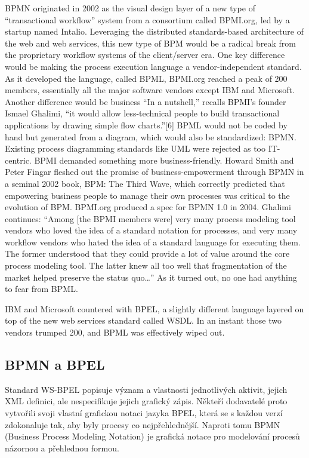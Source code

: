 \documentclass[]{article}
\begin{document}
BPMN originated in 2002 as the visual design layer of a new type of “transactional workflow” system from a consortium called BPMI.org, led by a startup named Intalio. Leveraging the distributed standards-based architecture of the web and web services, this new type of BPM would be a radical break from the proprietary workflow systems of the client/server era. One key difference would be making the process execution language a vendor-independent standard. As it developed the language, called BPML, BPMI.org reached a peak of 200 members, essentially all the major software vendors except IBM and Microsoft. Another difference would be business “In a nutshell,” recalls BPMI’s founder Ismael Ghalimi, “it would allow less-technical people to build transactional applications by drawing simple flow charts.”[6] BPML would not be coded by hand but generated from a diagram, which would also be standardized: BPMN. Existing process diagramming standards like UML were rejected as too IT-centric. BPMI demanded something more business-friendly. Howard Smith and Peter Fingar fleshed out the promise of business-empowerment through BPMN in a seminal 2002 book, BPM: The Third Wave, which correctly predicted that empowering business people to manage their own processes was critical to the evolution of BPM. BPMI.org produced a spec for BPMN 1.0 in 2004. Ghalimi continues: “Among [the BPMI members were] very many process modeling tool vendors who loved the idea of a standard notation for processes, and very many workflow vendors who hated the idea of a standard language for executing them. The former understood that they could provide a lot of value around the core process modeling tool. The latter knew all too well that fragmentation of the market helped preserve the status quo…” As it turned out, no one had anything to fear from BPML.

IBM and Microsoft countered with BPEL, a slightly different language layered on top of the new web services standard called WSDL. In an instant those two vendors trumped 200, and BPML was effectively wiped out.

\subsection{BPMN a BPEL}
Standard WS-BPEL popisuje význam a vlastnosti jednotlivých aktivit, jejich XML definici, ale nespecifikuje jejich grafický zápis.
Někteří dodavatelé proto vytvořili svoji vlastní grafickou notaci jazyka BPEL, která se s každou verzí zdokonaluje tak, aby byly procesy co nejpřehlednější.
Naproti tomu BPMN (Business Process Modeling Notation) je grafická notace pro modelování procesů názornou a přehlednou formou.
\end{document}
